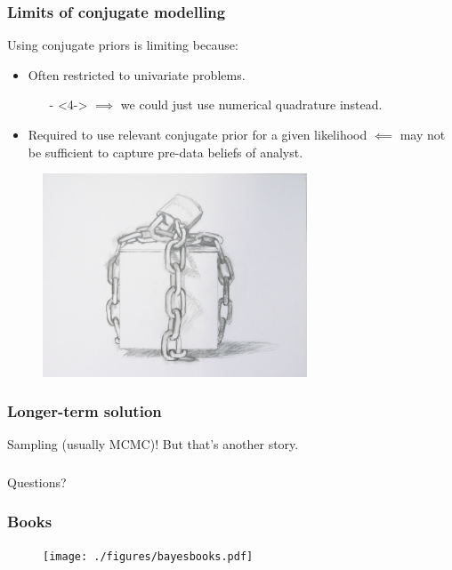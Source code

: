 \documentclass[handout]{beamer}
\begin{document}
\begin{frame}
	\frametitle{Limits of conjugate modelling}
	 Using conjugate priors is limiting because:
	
	\begin{itemize}
		\item<3-> Often restricted to univariate problems.
		\begin{itemize}
			\item[-]<4-> $\implies$ we could just use numerical quadrature instead.
		\end{itemize}
		\item<5-> Required to use relevant conjugate prior for a given likelihood $\impliedby$ may not be sufficient to capture pre-data beliefs of analyst.
	\end{itemize}
	
	\begin{figure}
		\centerline{\includegraphics[width=0.7\textwidth]{./figures/trapped.jpg}}
	\end{figure}
	
\end{frame}

\begin{frame}
	\frametitle{Longer-term solution}
	
	\Huge Sampling (usually MCMC)! But that's another story.
\end{frame}

\begin{frame}
	\frametitle{}
	{\Huge Questions?}
\end{frame}

\begin{frame}
	\frametitle{Books}
	
	\begin{figure}[ht]
		\centerline{\texttt{[image: ./figures/bayesbooks.pdf]}}
	\end{figure}
\end{frame}
\end{document}
